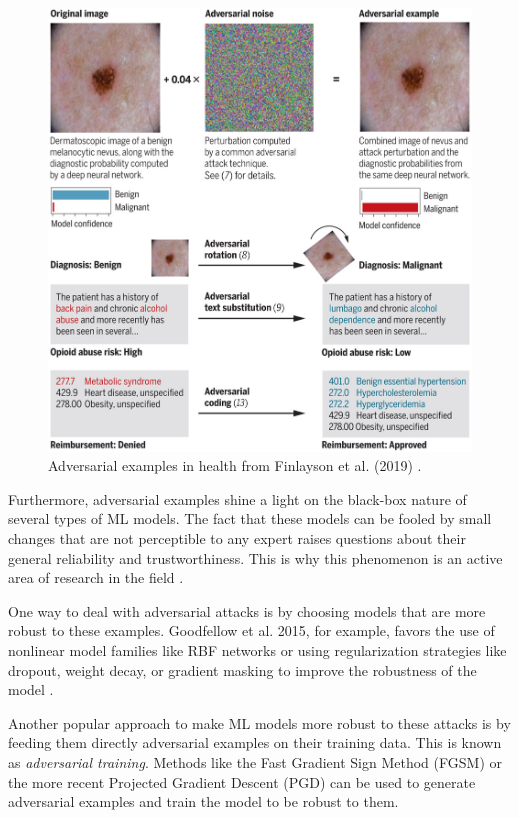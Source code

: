 \documentclass[../main.tex]{subfiles}
\begin{document}
    \begin{figure}[h]
        \includegraphics[width=0.65\linewidth]{figures/medical-adversarial-attacks.jpeg}
        \caption{Adversarial examples in health from Finlayson et al. (2019) \cite{finlayson_adversarial_2019}.}
        \label{fig:medical_adversarial_attacks}
    \end{figure}

    Furthermore, adversarial examples shine a light on the black-box nature of several types of ML models. The fact that these models can be fooled by small changes that are not perceptible to any expert raises questions about their general reliability and trustworthiness. This is why this phenomenon is an active area of research in the field \cite{finlayson_adversarial_2019}.

    One way to deal with adversarial attacks is by choosing models that are more robust to these examples. Goodfellow et al. 2015, for example, favors the use of nonlinear model families like RBF networks or using regularization strategies like dropout, weight decay, or gradient masking to improve the robustness of the model \autocite{goodfellowExplainingHarnessingAdversarial2015}.
    
    Another popular approach to make ML models more robust to these attacks is by feeding them directly adversarial examples on their training data. This is known as \textit{adversarial training}. Methods like the Fast Gradient Sign Method \cite{goodfellowExplainingHarnessingAdversarial2015} (FGSM) or the more recent Projected Gradient Descent (PGD) \autocite{madryDeepLearningModels2019}  can be used to generate adversarial examples and train the model to be robust to them. 
\end{document}
